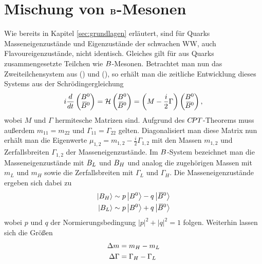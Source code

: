 \section[head={Mischung von \B-Mesonen},tocentry={Mischung von \B-Mesonen}]{Mischung von $\mathbf{{B}}$-Mesonen}\label{sec:mixing}

Wie bereits in Kapitel \ref{sec:grundlagen} erläutert, sind für Quarks Masseneigenzustände und Eigenzustände der schwachen WW, auch Flavoureigenzustände, nicht identisch. Gleiches gilt für aus Quarks zusammengesetzte Teilchen wie ${B}$-Mesonen. Betrachtet man nun das Zweiteilchensystem aus \Bz (\bquarkbar\dquark) und \Bzb (\bquark\dquarkbar), so erhält man die zeitliche Entwicklung dieses Systems aus der Schrödingergleichung
\begin{equation}
i\frac{d}{dt}\begin{pmatrix}{\ensuremath{{B}^0}}\\ {{\kern 0.18em\overline{\kern -0.18em B}{}}{}^0}\end{pmatrix}=\mathcal{H}\begin{pmatrix}{\ensuremath{{B}^0}}\\ {{\kern 0.18em\overline{\kern -0.18em B}{}}{}^0}\end{pmatrix}=\left(M-\frac{i}{2}\Gamma\right)\begin{pmatrix}{\ensuremath{{B}^0}}\\ {{\kern 0.18em\overline{\kern -0.18em B}{}}{}^0}\end{pmatrix},
\end{equation}
wobei $M$ und $\Gamma$ hermitesche Matrizen sind. Aufgrund des ${C\!PT}$-Theorems muss außerdem  $m_{11}=m_{22}$ und $\Gamma_{11}=\Gamma_{22}$ gelten. Diagonalisiert man diese Matrix nun erhält man die Eigenwerte $\mu_{1,2}=m_{1,2}-\frac{i}{2}\Gamma_{1,2}$ mit den Massen $m_{1,2}$ und Zerfallsbreiten $\Gamma_{1,2}$ der Masseneigenzustände. Im ${B}$-System bezeichnet man  die Masseneigenzustände mit ${B}_L$ und ${B}_H$ und analog die zugehörigen Massen mit  $m_L$ und $m_H$ sowie die Zerfallsbreiten mit $\Gamma_L$ und $\Gamma_H$. Die Masseneigenzustände ergeben sich dabei zu
\begin{equation}
\begin{split}
\left|B_H\right>&\sim p\left|{{B}^0}\right>-q\left|{{\kern 0.18em\overline{\kern -0.18em B}{}}{}^0}\right>\\
\left|B_L\right>&\sim p\left|{{B}^0}\right>+q\left|{{\kern 0.18em\overline{\kern -0.18em B}{}}{}^0}\right>
\end{split}
\end{equation}
wobei $p$ und $q$ der Normierungsbedingung $\left|p\right|^2+\left|q\right|^2=1$ folgen. Weiterhin lassen sich die Größen 
\begin{align}
{\ensuremath{\Delta m}}&=m_H-m_L\\
\Delta\Gamma&=\Gamma_H-\Gamma_L
\end{align}
